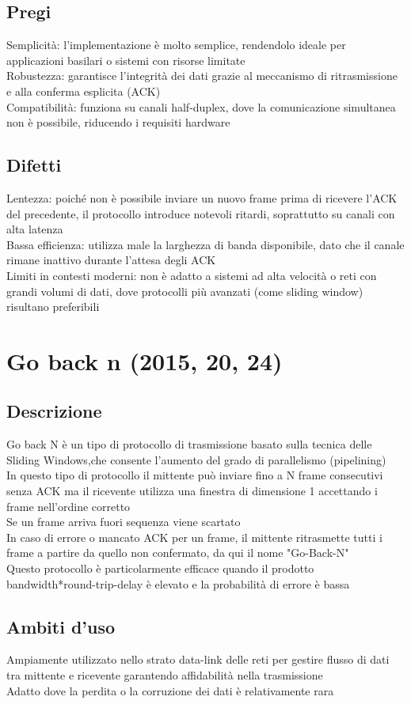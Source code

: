 \documentclass[10pt,oneside,a4paper]{article}
\begin{document}
\subsection{Pregi}
Semplicità: l'implementazione è molto semplice, rendendolo ideale per applicazioni basilari o sistemi con risorse limitate\\
Robustezza: garantisce l'integrità dei dati grazie al meccanismo di ritrasmissione e alla conferma esplicita (ACK)\\
Compatibilità: funziona su canali half-duplex, dove la comunicazione simultanea non è possibile, riducendo i requisiti hardware
\subsection{Difetti}
Lentezza: poiché non è possibile inviare un nuovo frame prima di ricevere l'ACK del precedente, il protocollo introduce notevoli ritardi, soprattutto su canali con alta latenza\\
Bassa efficienza: utilizza male la larghezza di banda disponibile, dato che il canale rimane inattivo durante l'attesa degli ACK\\
Limiti in contesti moderni: non è adatto a sistemi ad alta velocità o reti con grandi volumi di dati, dove protocolli più avanzati (come sliding window) risultano preferibili
\section{Go back n (2015, 20, 24)}
\subsection{Descrizione}
Go back N è un tipo di protocollo di trasmissione basato sulla tecnica delle Sliding Windows,che consente l'aumento del grado di parallelismo (pipelining)\\
In questo tipo di protocollo il mittente può inviare fino a N frame consecutivi senza ACK ma il ricevente utilizza una finestra di dimensione 1 accettando i frame nell'ordine corretto\\
Se un frame arriva fuori sequenza viene scartato\\
In caso di errore o mancato ACK per un frame, il mittente ritrasmette tutti i frame a partire da quello non confermato, da qui il nome "Go-Back-N"\\
Questo protocollo è particolarmente efficace quando il prodotto bandwidth*round-trip-delay è elevato e la probabilità di errore è bassa
\subsection{Ambiti d'uso}
Ampiamente utilizzato nello strato data-link delle reti per gestire flusso di dati tra mittente e ricevente garantendo affidabilità nella trasmissione\\
Adatto dove la perdita o la corruzione dei dati è relativamente rara
\end{document}
